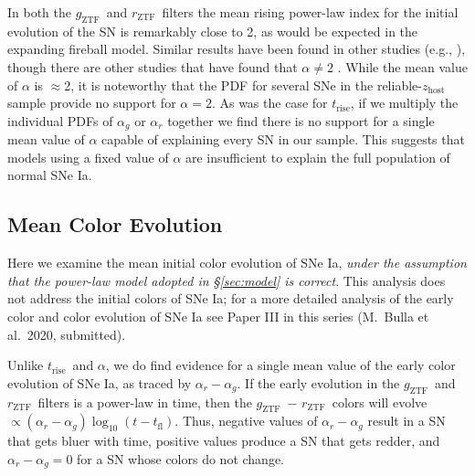 \documentclass[twocolumn]{./aastex63}
\newcommand{\rztf}{$r_\mathrm{ZTF}$}
\newcommand{\gztf}{$g_\mathrm{ZTF}$}
\newcommand{\trise}{$t_\mathrm{rise}$}
\begin{document}
In both the \gztf\ and \rztf\ filters the mean rising power-law index for the
initial evolution of the SN is remarkably close to 2, as would be expected in
the expanding fireball model. Similar results have been found in other studies
(e.g., \citealt{Conley06,Hayden10,Ganeshalingam11,Zheng17a}), though there are
other studies that have found that $\alpha \neq 2$ \citep{Firth15}. While the
mean value of $\alpha$ is $\approx$2, it is noteworthy that the PDF for several
SNe in the reliable-$z_\mathrm{host}$ sample provide no support for $\alpha =
2$. As was the case for \trise, if we multiply the individual PDFs of $\alpha_g$
or $\alpha_r$ together we find there is no support for a single mean value of
$\alpha$ capable of explaining every SN in our sample. This suggests that models
using a fixed value of $\alpha$ are insufficient to explain the full population
of normal SNe Ia.

\subsection{Mean Color Evolution}\label{sec:colors}

Here we examine the mean initial color evolution of SNe Ia, \textit{under the
assumption that the power-law model adopted in \S\ref{sec:model} is correct}.
This analysis does not address the initial colors of SNe Ia; for a more
detailed analysis of the early color and color evolution of SNe Ia see Paper
III in this series (M.~Bulla et al.~2020, submitted).

Unlike \trise\ and $\alpha$, we do find evidence for a single mean value of
the early color evolution of SNe Ia, as traced by $\alpha_r - \alpha_g$. If
the early evolution in the \gztf\ and \rztf\ filters is a power-law in time,
then the \gztf\ $-$ \rztf\ colors will evolve $\propto (\alpha_r - \alpha_g)
\log_{10} (t - t_\mathrm{fl})$. Thus, negative values of $\alpha_r - \alpha_g$
result in a SN that gets bluer with time, positive values produce a SN that
gets redder, and $\alpha_r - \alpha_g = 0$ for a SN whose colors do not change.
\end{document}
